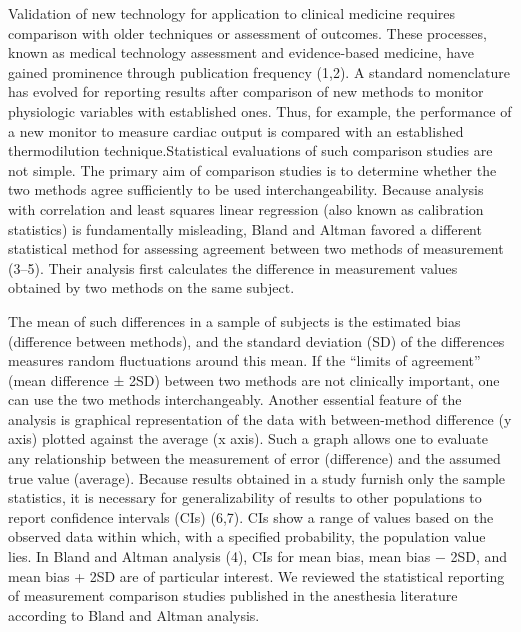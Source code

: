 \documentclass[]{article}
\begin{document}
Validation of new technology for application to clinical medicine requires comparison with older techniques or assessment of outcomes. These processes, known as medical technology assessment and evidence-based medicine, have gained prominence through publication frequency (1,2). A standard nomenclature has evolved for reporting results after comparison of new methods to monitor physiologic variables with established ones. Thus, for example, the performance of a new monitor to measure cardiac output is compared with an established thermodilution technique.Statistical evaluations of such comparison studies are not simple. The primary aim of comparison studies is to determine whether the two methods agree sufficiently to be used interchangeability. Because analysis with correlation and least squares linear regression (also known as calibration statistics) is fundamentally misleading, Bland and Altman favored a different statistical method for assessing agreement between two methods of measurement (3–5). Their analysis first calculates the difference in measurement values obtained by two methods on the same subject. 

The mean of such differences in a sample of subjects is the estimated bias (difference between methods), and the standard deviation (SD) of the differences measures random fluctuations around this mean. If the “limits of agreement” (mean difference ± 2SD) between two methods are not clinically important, one can use the two methods interchangeably. Another essential feature of the analysis is graphical representation of the data with between-method difference (y axis) plotted against the average (x axis). Such a graph allows one to evaluate any relationship between the measurement of error (difference) and the assumed true value (average). Because results obtained in a study furnish only the sample statistics, it is necessary for generalizability of results to other populations to report confidence intervals (CIs) (6,7). CIs show a range of values based on the observed data within which, with a specified probability, the population value lies. In Bland and Altman analysis (4), CIs for mean bias, mean bias − 2SD, and mean bias + 2SD are of particular interest. We reviewed the statistical reporting of measurement comparison studies published in the anesthesia literature according to Bland and Altman analysis.
%
\end{document}
